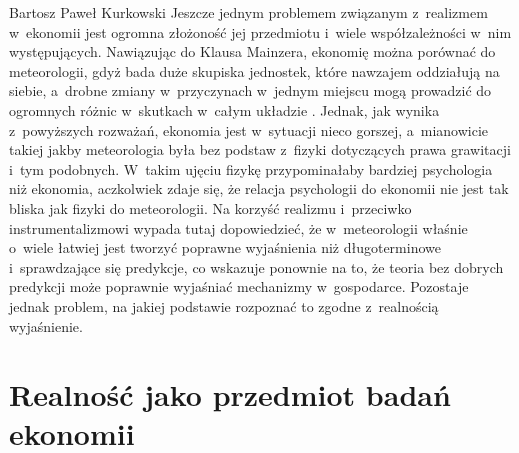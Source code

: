 \begin{artplenv}{Bartosz Paweł Kurkowski}
Jeszcze jednym problemem związanym z~realizmem w~ekonomii jest ogromna złożoność jej przedmiotu i~wiele współzależności
w~nim występujących. Nawiązując do Klausa Mainzera, ekonomię można porównać do meteorologii, gdyż bada duże skupiska
jednostek, które nawzajem oddziałują na siebie, a~drobne zmiany w~przyczynach w~jednym miejscu mogą prowadzić do
ogromnych różnic w~skutkach w~całym układzie
\parencite[s.~278–280]{gorazda_filozofia_2014}.
Jednak, jak
wynika z~powyższych rozważań, ekonomia jest w~sytuacji nieco gorszej, a~mianowicie takiej jakby meteorologia była bez
podstaw z~fizyki dotyczących prawa grawitacji i~tym podobnych. W~takim ujęciu fizykę przypominałaby bardziej psychologia niż
ekonomia, aczkolwiek zdaje się, że relacja psychologii do ekonomii nie jest tak bliska jak fizyki do meteorologii. Na
korzyść realizmu i~przeciwko instrumentalizmowi wypada tutaj dopowiedzieć, że w~meteorologii właśnie o~wiele łatwiej
jest tworzyć poprawne wyjaśnienia niż długoterminowe i~sprawdzające się predykcje, co wskazuje ponownie na to, że
teoria bez dobrych predykcji może poprawnie wyjaśniać mechanizmy w~gospodarce. Pozostaje jednak problem, na jakiej
podstawie rozpoznać to zgodne z~realnością wyjaśnienie.

\section{Realność jako przedmiot badań ekonomii}


\end{artplenv}
